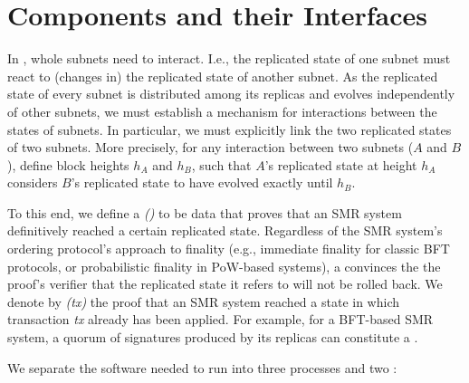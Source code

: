  \section{Components and their Interfaces}
 \label{sec:components}

In \ipc, whole subnets need to interact.
I.e., the replicated state of one subnet must react to (changes in) the replicated state of another subnet.
As the replicated state of every subnet is distributed among its replicas and evolves independently of other subnets,
we must establish a mechanism for interactions between the states of subnets.
In particular, we must explicitly link the two replicated states of two subnets.
More precisely, for any interaction between two subnets ($A$ and $B$), define block heights $h_A$ and $h_B$,
such that $A$'s replicated state at height $h_A$ considers $B$'s replicated state to have evolved exactly until $h_B$.

To this end, we define a \emph{\pofFull (\pof)} to be data that proves that an SMR system definitively reached a certain replicated state.
Regardless of the SMR system's ordering protocol's approach to finality (e.g., immediate finality for classic BFT protocols, or probabilistic finality in PoW-based systems),
a \pof convinces the the proof's verifier that the replicated state it refers to will not be rolled back.
We denote by \emph{\pof(tx)} the proof that an SMR system reached a state in which transaction \emph{tx} already has been applied.
For example, for a BFT-based SMR system, a quorum of signatures produced by its replicas can constitute a \pof.



We separate the software needed to run \ipc into three processes and two \dapps:

